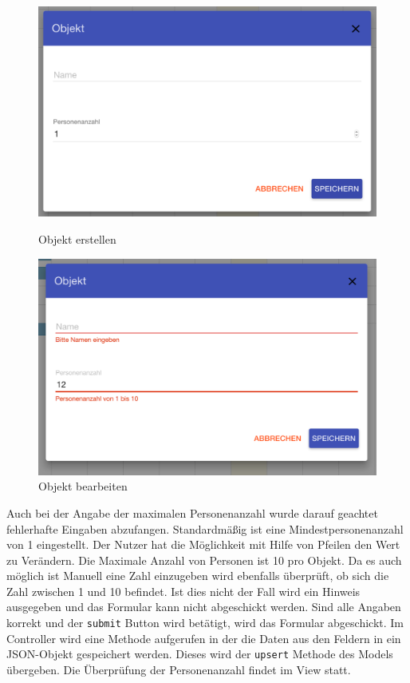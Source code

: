 \begin{figure}[H]
    \centering
    \begin{minipage}[t]{0.49\linewidth}
        \centering
        \includegraphics[width=\linewidth]{images/frontend_resource_new.png}
        \caption{Objekt erstellen}
        \label{frontend_resource_new}
    \end{minipage}
    \hfill
    \begin{minipage}[t]{0.49\linewidth}
        \centering
        \includegraphics[width=\linewidth]{images/frontend_resource_fail.png}
        \caption{Objekt bearbeiten}
		\label{frontend_resource_fail}
    \end{minipage}
\end{figure}

 Auch bei der Angabe der maximalen Personenanzahl wurde darauf geachtet fehlerhafte Eingaben abzufangen. Standardmäßig ist eine Mindestpersonenanzahl von 1 eingestellt. Der Nutzer hat die Möglichkeit mit Hilfe von Pfeilen den Wert zu Verändern. Die Maximale Anzahl von Personen ist 10 pro Objekt. Da es auch möglich ist Manuell eine Zahl einzugeben wird ebenfalls überprüft, ob sich die Zahl zwischen 1 und 10 befindet. Ist dies nicht der Fall wird ein Hinweis ausgegeben und das Formular kann nicht abgeschickt werden. 
 Sind alle Angaben korrekt und der \texttt{submit} Button wird betätigt, wird das Formular abgeschickt. Im Controller wird eine Methode aufgerufen in der die Daten aus den Feldern in ein JSON-Objekt gespeichert werden. Dieses wird der \texttt{upsert} Methode des Models übergeben. Die Überprüfung der Personenanzahl findet im View statt.
 
